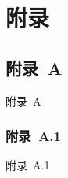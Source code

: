 

\renewcommand\thesection{\Alph{section}}
\renewcommand\theequation{\Alph{section}.\arabic{equation}}
\appendix

\chapter*{附\quad 录}\label{sec:num_sim}


\section{附录~A}

    附录~A

\subsection{附录~A.1}\label{A}

    附录~A.1


